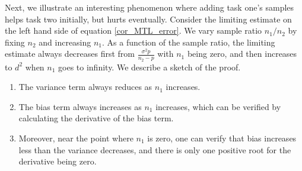 Next, we illustrate an interesting phenomenon where adding task one's samples helps task two initially, but hurts eventually.
Consider the limiting estimate on the left hand side of equation \eqref{cor_MTL_error}.
We vary sample ratio $n_1 / n_2$ by fixing $n_2$ and increasing $n_1$.
As a function of the sample ratio, the limiting estimate always decreases first from $\frac{\sigma^2 p}{n_2 - p}$ with $n_1$ being zero, and then increases to $d^2$ when $n_1$ goes to infinity.
We describe a sketch of the proof.
\begin{enumerate}
	\item The variance term always reduces as $n_1$ increases.
	\item The bias term always increases as $n_1$ increases, which can be verified by calculating the derivative of the bias term.
	\item Moreover, near the point where $n_1$ is zero, one can verify that bias increases less than the variance decreases, and there is only one positive root for the derivative being zero.
\end{enumerate}

